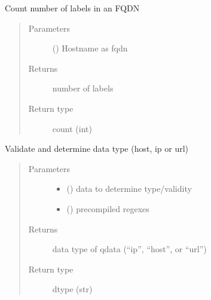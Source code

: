 \documentclass[letterpaper,10pt,english]{sphinxmanual}
\begin{document}

\begin{fulllineitems}
\label{\detokenize{utils:bloxone.utils.count_labels}}
\sphinxAtStartPar
Count number of labels in an FQDN
\begin{quote}\begin{description}
\item[{Parameters}] \leavevmode
\sphinxAtStartPar
{} () \textendash{} Hostname as fqdn

\item[{Returns}] \leavevmode
\sphinxAtStartPar
number of labels

\item[{Return type}] \leavevmode
\sphinxAtStartPar
count (int)

\end{description}\end{quote}

\end{fulllineitems}


\begin{fulllineitems}
\label{\detokenize{utils:bloxone.utils.data_type}}
\sphinxAtStartPar
Validate and determine data type (host, ip or url)
\begin{quote}\begin{description}
\item[{Parameters}] \leavevmode\begin{itemize}
\item {} 
\sphinxAtStartPar
{} () \textendash{} data to determine type/validity

\item {} 
\sphinxAtStartPar
{} () \textendash{} pre\sphinxhyphen{}compiled regexes

\end{itemize}

\item[{Returns}] \leavevmode
\sphinxAtStartPar
data type of qdata (“ip”, “host”, or “url”)

\item[{Return type}] \leavevmode
\sphinxAtStartPar
dtype (str)

\end{description}\end{quote}

\end{fulllineitems}
\end{document}
